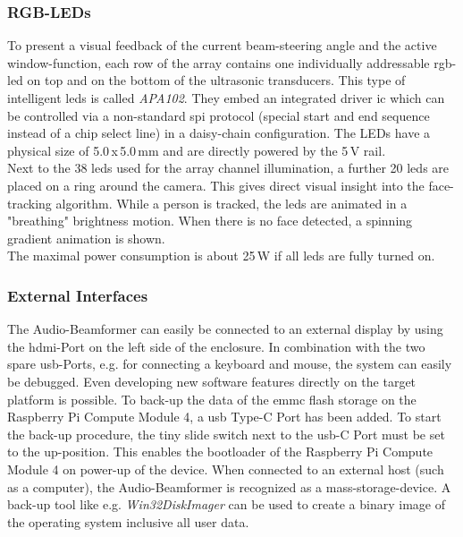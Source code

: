 \subsubsection{RGB-LEDs}
To present a visual feedback of the current beam-steering angle and the active window-function, each row of the array contains one individually addressable \acrshort{rgb}-\acrshort{led} on top and on the bottom of the ultrasonic transducers. This type of intelligent \acrshort{led}s is called \textit{APA102}. They embed an integrated driver \acrshort{ic} which can be controlled via a non-standard \acrshort{spi} protocol (special start and end sequence instead of a chip select line) in a daisy-chain configuration. The LEDs have a physical size of 5.0\,x\,5.0\,mm and are directly powered by the 5\,V rail.\\
Next to the 38 \acrshort{led}s used for the array channel illumination, a further 20 \acrshort{led}s are placed on a ring around the camera. This gives direct visual insight into the face-tracking algorithm. While a person is tracked, the \acrshort{led}s are animated in a "breathing" brightness motion. When there is no face detected, a spinning gradient animation is shown.\\
The maximal power consumption is about 25\,W if all \acrshort{led}s are fully turned on.

\subsubsection{External Interfaces}
The Audio-Beamformer can easily be connected to an external display by using the \acrshort{hdmi}-Port on the left side of the enclosure. In combination with the two spare \acrshort{usb}-Ports, e.g. for connecting a keyboard and mouse, the system can easily be debugged. Even developing new software features directly on the target platform is possible. To back-up the data of the \acrshort{emmc} flash storage on the Raspberry Pi Compute Module 4, a  \acrshort{usb} Type-C Port has been added. To start the back-up procedure, the tiny slide switch next to the \acrshort{usb}-C Port must be set to the up-position. This enables the bootloader of the Raspberry Pi Compute Module 4 on power-up of the device. When connected to an external host (such as a computer), the Audio-Beamformer is recognized as a mass-storage-device. A back-up tool like e.g. \textit{Win32DiskImager} can be used to create a binary image of the operating system inclusive all user data.


